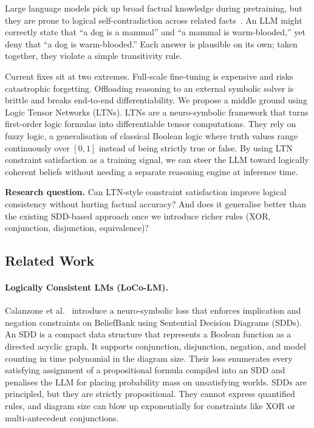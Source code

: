 \documentclass[11pt,a4paper]{article}
\begin{document}
Large language models pick up broad factual knowledge during pretraining,
but they are prone to logical self-contradiction across related
facts~\cite{kassner2021beliefbank}.  An LLM might correctly state that
``a dog is a mammal'' and ``a mammal is warm-blooded,'' yet deny that
``a dog is warm-blooded.''  Each answer is plausible on its own; taken
together, they violate a simple transitivity rule.

Current fixes sit at two extremes.  Full-scale fine-tuning is expensive
and risks catastrophic forgetting.  Offloading reasoning to an external
symbolic solver is brittle and breaks end-to-end differentiability.  We
propose a middle ground using Logic Tensor Networks (LTNs).  LTNs
are a neuro-symbolic framework that turns first-order logic formulas into
differentiable tensor computations.  They rely on fuzzy logic, a
generalisation of classical Boolean logic where truth values range
continuously over $[0,1]$ instead of being strictly true or false.  By
using LTN constraint satisfaction as a training signal, we can steer the
LLM toward logically coherent beliefs without needing a separate reasoning
engine at inference time.

\medskip
\noindent\textbf{Research question.}
Can LTN-style constraint satisfaction improve logical consistency without
hurting factual accuracy?  And does it generalise better than the existing
SDD-based approach once we introduce richer rules (XOR, conjunction,
disjunction, equivalence)?

\subsection{Related Work}

\paragraph{Logically Consistent LMs (LoCo-LM).}
Calanzone et al.~\cite{calanzone2025loco} introduce a neuro-symbolic loss
that enforces implication and negation constraints on BeliefBank using
Sentential Decision Diagrams (SDDs).  An SDD is a compact data
structure that represents a Boolean function as a directed acyclic graph.
It supports conjunction, disjunction, negation, and model counting in
time polynomial in the diagram size.  Their loss enumerates every
satisfying assignment of a propositional formula compiled into an SDD and
penalises the LLM for placing probability mass on unsatisfying worlds.
SDDs are principled, but they are strictly propositional. They
cannot express quantified rules, and diagram size can blow up
exponentially for constraints like XOR or multi-antecedent conjunctions.
\end{document}
